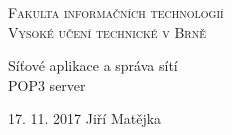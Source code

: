 \documentclass[a4paper, 11pt, onecolumn]{article}
\begin{document}
{
\begin{center}

\Huge
\textsc{
Fakulta informačních technologií \\
Vysoké učení technické v Brně}\\


\LARGE
Síťové aplikace a správa sítí\\
POP3 server\\

\end{center}

\Large{17. 11. 2017} \hfill Jiří Matějka
}%
\thispagestyle{empty}


\newpage
\tableofcontents
\newpage
\setcounter{page}{1}
\end{document}
